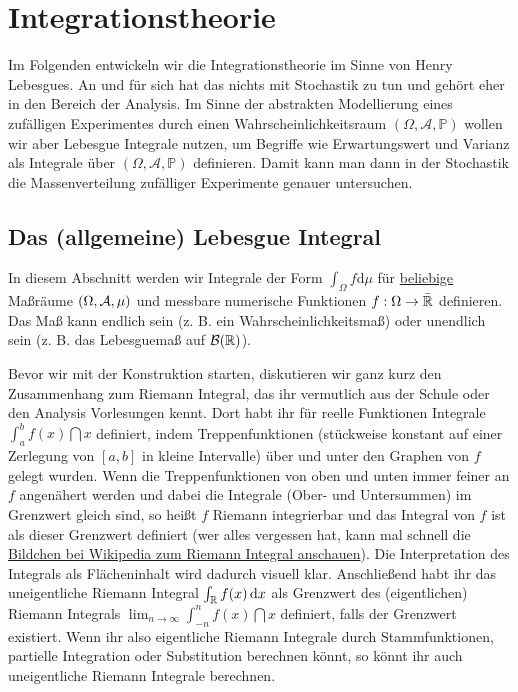 
\chapter{Integrationstheorie}
\marginpar{\textcolor{red}{Vorlesung 9}}
Im Folgenden entwickeln wir die Integrationstheorie im Sinne von Henry Lebesgues. An und f\"ur sich hat das nichts mit Stochastik zu tun und geh\"ort eher in den Bereich der Analysis. Im Sinne der abstrakten Modellierung eines zuf\"alligen Experimentes durch einen Wahrscheinlichkeitsraum $(\Omega, \mathcal A, \mathbb P)$ wollen wir aber Lebesgue Integrale nutzen, um Begriffe wie Erwartungswert und Varianz als Integrale \"uber $(\Omega, \mathcal A, \mathbb P)$ definieren. Damit kann man dann in der Stochastik die Massenverteilung zuf\"alliger Experimente genauer untersuchen.

\section{Das (allgemeine) Lebesgue Integral}

In diesem Abschnitt werden wir Integrale der Form $ \int_{\Omega} f \mathrm{d}\mu$ für \underline{beliebige} Ma\ss r\"aume $(\Omega, \mathcal{A}, \mu)$ und messbare numerische Funktionen $f:\Omega\to \bar {\mathbb{R}}$ definieren. Das Ma\ss{} kann endlich sein (z. B. ein Wahrscheinlichkeitsma\ss) oder unendlich sein (z. B. das Lebesguema\ss{} auf $\mathcal B(\mathbb{R})$).\smallskip

 Bevor wir mit der Konstruktion starten, diskutieren wir ganz kurz den Zusammenhang zum Riemann Integral, das ihr vermutlich aus der Schule oder den Analysis Vorlesungen kennt. Dort habt ihr für reelle Funktionen Integrale $\int_a^b f(x)\dint x$ definiert, indem Treppenfunktionen (st\"uckweise konstant auf einer Zerlegung von $[a,b]$ in kleine Intervalle) \"uber und unter den Graphen von $f$ gelegt wurden. Wenn die Treppenfunktionen von oben und unten immer feiner an $f$ angen\"ahert werden und dabei die Integrale (Ober- und Untersummen) im Grenzwert gleich sind, so hei\ss t $f$ Riemann integrierbar und das Integral von $f$ ist als dieser Grenzwert definiert (wer alles vergessen hat, kann mal schnell die \href{https://de.wikipedia.org/wiki/Riemannsches_Integral}{Bildchen bei Wikipedia zum Riemann Integral anschauen}). Die Interpretation des Integrals als Fl\"acheninhalt wird dadurch visuell klar. Anschlie\ss end habt ihr das uneigentliche Riemann Integral $\int_{\mathbb{R}} f(x)\, \mathrm{d} x$ als Grenzwert des (eigentlichen) Riemann Integrals $\lim_{n\to\infty} \int_{-n}^n f(x)\dint x$ definiert, falls der Grenzwert existiert. Wenn ihr also eigentliche Riemann Integrale durch Stammfunktionen, partielle Integration oder Substitution berechnen k\"onnt, so k\"onnt ihr auch uneigentliche Riemann Integrale berechnen. 
 
